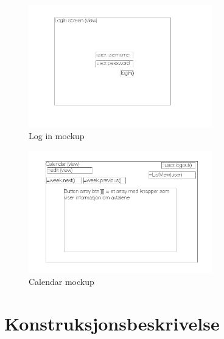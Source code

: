 \documentclass{article}
\begin{document}
\begin{figure}[h!] 
    \begin{center} 
        \includegraphics[width=8cm]{login_screen.png}
        \caption{Log in mockup}
    \label{loginmockup}
    \end{center}
\end{figure}

\begin{figure}[h!] 
    \begin{center} 
        \includegraphics[width=8cm]{Calendar_view.png}
        \caption{Calendar mockup}
    \label{mainmockup}
    \end{center}
\end{figure}









\section{Konstruksjonsbeskrivelse}
\end{document}
